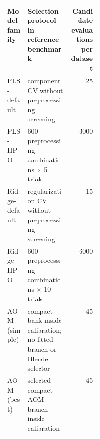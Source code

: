 \begin{tabularx}{\linewidth}{p{0.22\linewidth}Xr}
\toprule
Model family & Selection protocol in reference benchmark & Candidate evaluations per dataset \\
\midrule
PLS-default & component CV without preprocessing screening & 25 \\
PLS-HPO & 600 preprocessing combinations $\times$ 5 trials & 3000 \\
Ridge-default & regularization CV without preprocessing screening & 15 \\
Ridge-HPO & 600 preprocessing combinations $\times$ 10 trials & 6000 \\
AOM (simple) & compact bank inside calibration; no fitted branch or Blender selector & 45 \\
AOM (best) & selected compact AOM branch inside calibration & 45 \\
\bottomrule
\end{tabularx}
